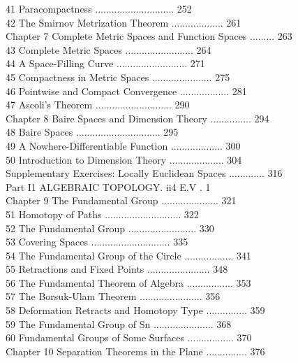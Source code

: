 41 Paracompactness ............................. 252 \\
42 The Smirnov Metrization Theorem ................... 261  \\
Chapter 7 Complete Metric Spaces and Function Spaces ......... 263 \\
43 Complete Metric Spaces ......................... 264 \\
44 A Space-Filling Curve .......................... 271 \\
45 Compactness in Metric Spaces ...................... 275 \\
46 Pointwise and Compact Convergence .................. 281 \\
47 Ascoli's Theorem ............................ 290 \\
Chapter 8 Baire Spaces and Dimension Theory ............... 294 \\
48 Baire Spaces ............................... 295 \\
49 A Nowhere-Differentiable Function ................... 300 \\
50 Introduction to Dimension Theory .................... 304 \\
Supplementary Exercises: Locally Euclidean Spaces ............. 316 \\
Part I1 ALGEBRAIC TOPOLOGY. ii4 E.V . 1 \\
Chapter 9 The Fundamental Group ..................... 321 \\
51 Homotopy of Paths ............................ 322 \\
52 The Fundamental Group ......................... 330 \\
53 Covering Spaces ............................. 335 \\
54 The Fundamental Group of the Circle .................. 341 \\
55 Retractions and Fixed Points ....................... 348 \\
56 The Fundamental Theorem of Algebra ................. 353 \\
57 The Borsuk-Ulam Theorem ....................... 356 \\
58 Deformation Retracts and Homotopy Type ............... 359 \\
59 The Fundamental Group of Sn ...................... 368 \\
60 Fundamental Groups of Some Surfaces ................. 370 \\
Chapter 10 Separation Theorems in the Plane ............... 376 \\
